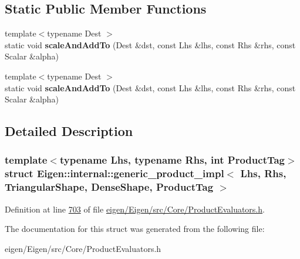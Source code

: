 \subsection*{Static Public Member Functions}
\begin{DoxyCompactItemize}
\item 
\mbox{\label{struct_eigen_1_1internal_1_1generic__product__impl_3_01_lhs_00_01_rhs_00_01_triangular_shape_00_4d5779e6000f2bc51bed3ea9b35ea4da_a5f3a603f35342fbf763ec755c6320bf6}} 
{\footnotesize template$<$typename Dest $>$ }\\static void {\bfseries scale\+And\+Add\+To} (Dest \&dst, const Lhs \&lhs, const Rhs \&rhs, const Scalar \&alpha)
\item 
\mbox{\label{struct_eigen_1_1internal_1_1generic__product__impl_3_01_lhs_00_01_rhs_00_01_triangular_shape_00_4d5779e6000f2bc51bed3ea9b35ea4da_a5f3a603f35342fbf763ec755c6320bf6}} 
{\footnotesize template$<$typename Dest $>$ }\\static void {\bfseries scale\+And\+Add\+To} (Dest \&dst, const Lhs \&lhs, const Rhs \&rhs, const Scalar \&alpha)
\end{DoxyCompactItemize}


\subsection{Detailed Description}
\subsubsection*{template$<$typename Lhs, typename Rhs, int Product\+Tag$>$\newline
struct Eigen\+::internal\+::generic\+\_\+product\+\_\+impl$<$ Lhs, Rhs, Triangular\+Shape, Dense\+Shape, Product\+Tag $>$}



Definition at line \hyperlink{eigen_2_eigen_2src_2_core_2_product_evaluators_8h_source_l00703}{703} of file \hyperlink{eigen_2_eigen_2src_2_core_2_product_evaluators_8h_source}{eigen/\+Eigen/src/\+Core/\+Product\+Evaluators.\+h}.



The documentation for this struct was generated from the following file\+:\begin{DoxyCompactItemize}
\item 
eigen/\+Eigen/src/\+Core/\+Product\+Evaluators.\+h\end{DoxyCompactItemize}
